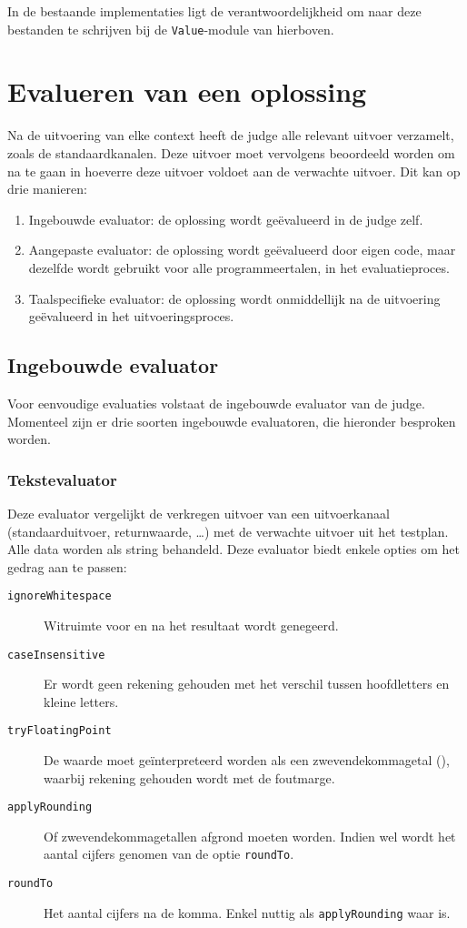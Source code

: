 In de bestaande implementaties ligt de verantwoordelijkheid om naar deze bestanden te schrijven bij de \texttt{Value}-module van hierboven.

\section{Evalueren van een oplossing}\label{sec:evalueren-van-een-oplossing2}

Na de uitvoering van elke context heeft de judge alle relevant uitvoer verzamelt, zoals de standaardkanalen.
Deze uitvoer moet vervolgens beoordeeld worden om na te gaan in hoeverre deze uitvoer voldoet aan de verwachte uitvoer.
Dit kan op drie manieren:
\begin{enumerate}
    \item Ingebouwde evaluator: de oplossing wordt geëvalueerd in de judge zelf.
    \item Aangepaste evaluator: de oplossing wordt geëvalueerd door eigen code, maar dezelfde wordt gebruikt voor alle programmeertalen, in het evaluatieproces.
    \item Taalspecifieke evaluator: de oplossing wordt onmiddellijk na de uitvoering geëvalueerd in het uitvoeringsproces.
\end{enumerate}

\subsection{Ingebouwde evaluator}\label{subsec:ingebouwde-evaluator}

Voor eenvoudige evaluaties volstaat de ingebouwde evaluator van de judge.
Momenteel zijn er drie soorten ingebouwde evaluatoren, die hieronder besproken worden.

\subsubsection{Tekstevaluator}

Deze evaluator vergelijkt de verkregen uitvoer van een uitvoerkanaal (standaarduitvoer, returnwaarde, \ldots) met de verwachte uitvoer uit het testplan.
Alle data worden als string behandeld.
Deze evaluator biedt enkele opties om het gedrag aan te passen:

\begin{description}
    \item[\texttt{ignoreWhitespace}] Witruimte voor en na het resultaat wordt genegeerd.
    \item[\texttt{caseInsensitive}] Er wordt geen rekening gehouden met het verschil tussen hoofdletters en kleine letters.
    \item[\texttt{tryFloatingPoint}] De waarde moet geïnterpreteerd worden als een zwevendekommagetal (), waarbij rekening gehouden wordt met de foutmarge.
    \item[\texttt{applyRounding}] Of zwevendekommagetallen afgrond moeten worden.
    Indien wel wordt het aantal cijfers genomen van de optie \texttt{roundTo}.
    \item[\texttt{roundTo}] Het aantal cijfers na de komma.
    Enkel nuttig als \texttt{applyRounding} waar is.
\end{description}

